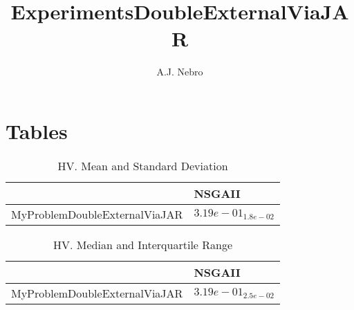 \documentclass{article}
\title{ExperimentsDoubleExternalViaJAR}
\author{A.J. Nebro}
\begin{document}
\maketitle
\section{Tables}

\begin{table}
\caption{HV. Mean and Standard Deviation}
\label{table: HV}
\centering
\begin{scriptsize}
\begin{tabular}{ll}
\hline &  NSGAII\\
\hline 
MyProblemDoubleExternalViaJAR & \cellcolor{gray95}$  3.19e-01_{ 1.8e-02}$ \\
\hline
\end{tabular}
\end{scriptsize}
\end{table}

\begin{table}
\caption{HV. Median and Interquartile Range}
\label{table: HV}
\centering
\begin{scriptsize}
\begin{tabular}{ll}
\hline &  NSGAII\\
\hline 
MyProblemDoubleExternalViaJAR & \cellcolor{gray95}$  3.19e-01_{ 2.5e-02}$ \\
\hline
\end{tabular}
\end{scriptsize}
\end{table}
\end{document}

